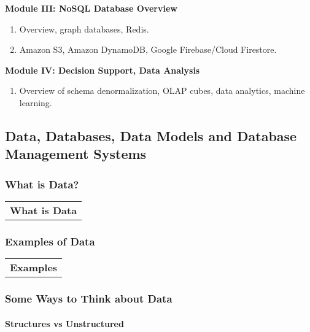 \documentclass[11pt]{article}
\providecommand{\tightlist}{%
      \setlength{\itemsep}{0pt}\setlength{\parskip}{0pt}}
\begin{document}
\textbf{Module III: NoSQL Database Overview}

\begin{enumerate}
\def\labelenumi{\arabic{enumi}.}
\setcounter{enumi}{7}
\item
  Overview, graph databases, Redis.
\item
  Amazon S3, Amazon DynamoDB, Google Firebase/Cloud Firestore.
\end{enumerate}

\textbf{Module IV: Decision Support, Data Analysis}

\begin{enumerate}
\def\labelenumi{\arabic{enumi}.}
\setcounter{enumi}{9}
\tightlist
\item
  Overview of schema denormalization, OLAP cubes, data analytics,
  machine learning.
\end{enumerate}

    \subsection{Data, Databases, Data Models and Database Management
Systems}\label{data-databases-data-models-and-database-management-systems}

\subsubsection{What is Data?}\label{what-is-data}

\begin{longtable}[]{@{}c@{}}
\toprule
\tabularnewline
\midrule
\endhead
\textbf{What is Data}\tabularnewline
\bottomrule
\end{longtable}

    \subsubsection{Examples of Data}\label{examples-of-data}

\begin{longtable}[]{@{}c@{}}
\toprule
\tabularnewline
\midrule
\endhead
\textbf{Examples}\tabularnewline
\bottomrule
\end{longtable}

    \subsubsection{Some Ways to Think about
Data}\label{some-ways-to-think-about-data}

\paragraph{Structures vs Unstructured}\label{structures-vs-unstructured}
\end{document}
